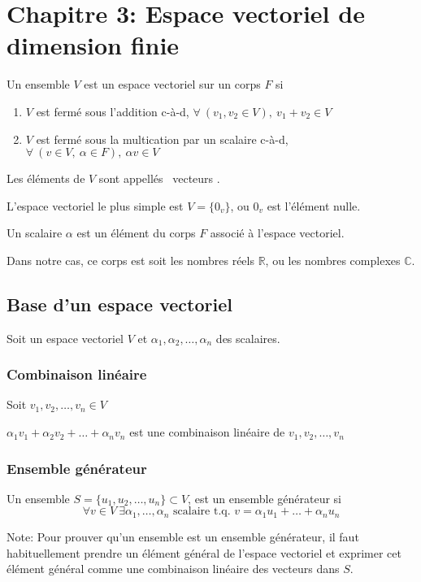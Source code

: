 \section{Chapitre 3: Espace vectoriel de dimension finie}
\begin{definition}
      Un ensemble $V$ est un espace vectoriel sur un corps $F$
      si \begin{enumerate}[1)]
            \item $V$ est fermé sous l'addition c-à-d, $
                        \forall \ (v_1, v_2 \in V), \ v_1 + v_2 \in V
                  $
            \item $V$ est fermé sous la multication par un scalaire c-à-d, $
                        \forall \ (v \in V, \ \alpha \in F), \ \alpha v \in V
                  $
      \end{enumerate}
      Les éléments de $V$ sont appellés \guillemetleft \ vecteurs \guillemetright.
\end{definition}
\begin{remark}
      L'espace vectoriel le plus simple est $V = \{ 0_v \}$, ou $0_v$ est l'élément nulle.
\end{remark}
\begin{definition}
      Un scalaire $\alpha$ est un élément du corps $F$ associé à l'espace vectoriel.
\end{definition}
Dans notre cas, ce corps est soit les nombres réels $\mathbb{R}$, ou les nombres complexes $\mathbb{C}$.

\subsection{Base d'un espace vectoriel}
Soit un espace vectoriel $V$ et $\alpha_1, \alpha_2, \ldots, \alpha_n$ des scalaires.

\subsubsection{Combinaison linéaire}
Soit $v_1, v_2, \ldots, v_n \in V$
\begin{definition}
      $\alpha_1 v_1 + \alpha_2 v_2 + \ldots + \alpha_n v_n$ est une combinaison linéaire de
      $v_1, v_2, \ldots, v_n$
\end{definition}

\subsubsection{Ensemble générateur}
\begin{definition}
      Un ensemble $S = \{ u_1, u_2, \ldots, u_n \} \subset V$, est un ensemble générateur si
      \[ \forall v \in V  \ \exists \alpha_1, \ldots, \alpha_n \text{ scalaire t.q. } v = \alpha_1 u_1 + \ldots + \alpha_n u_n\]
\end{definition}
Note: Pour prouver qu'un ensemble est un ensemble générateur, il faut habituellement
prendre un élément général de l'espace vectoriel et exprimer cet élément général
comme une combinaison linéaire des vecteurs dans $S$.

